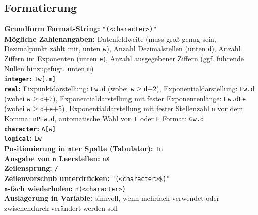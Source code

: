 \documentclass[a4paper, twocolumn]{scrarticle}
\begin{document}
 \subsection{Formatierung}
 \textbf{Grundform Format-String:} \lstinline|"(<character>)"|\\
 \textbf{Mögliche Zahlenangaben:}  Datenfeldweite (muss groß genug sein, Dezimalpunkt zählt mit, unten \lstinline|w|), Anzahl Dezimalstellen (unten \lstinline|d|), Anzahl Ziffern im Exponenten (unten \lstinline|e|), Anzahl ausgegebener Ziffern (ggf. führende Nullen hinzugefügt, unten \lstinline|m|)\\
 \textbf{\lstinline|integer|:} \lstinline|Iw[.m]|\\
 \textbf{\lstinline|real|:} Fixpunktdarstellung: \lstinline|Fw.d| (wobei \lstinline|w|$\geq$\lstinline|d|$+2$), Exponentialdarstellung: \lstinline|Ew.d| (wobei \lstinline|w|$\geq$\lstinline|d|$+7$), Exponentialdarstellung mit fester Exponentenlänge: \lstinline|Ew.dEe| (wobei \lstinline|w|$\geq$\lstinline|d|$+$\lstinline|e|$+5$), Exponentialdarstellung mit fester Stellenzahl \lstinline|n| vor dem Komma: \lstinline|nPEw.d|, automatische Wahl von \lstinline|F| oder \lstinline|E| Format: \lstinline|Gw.d|\\
 \textbf{\lstinline|character|:} \lstinline|A[w]|\\
 \textbf{\lstinline|logical|:} \lstinline|Lw|\\
 \textbf{Positionierung in \lstinline|n|ter Spalte (Tabulator):} \lstinline|Tn|\\
 \textbf{Ausgabe von \lstinline|n| Leerstellen:} \lstinline|nX|\\
 \textbf{Zeilensprung:} \lstinline|/|\\
 \textbf{Zeilenvorschub unterdrücken:} \lstinline|"(<character>$)"|\\
 \textbf{\lstinline|n|-fach wiederholen:} \lstinline|n(<character>)|\\
 \textbf{Auslagerung in Variable:} sinnvoll, wenn mehrfach verwendet oder  zwischendurch verändert werden soll
 
\end{document}
